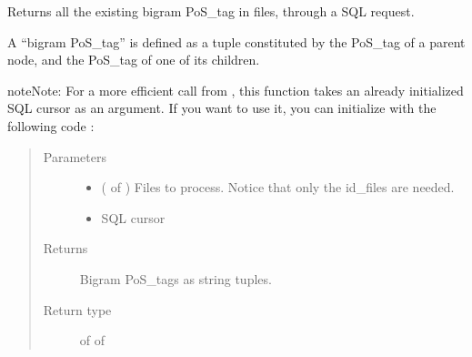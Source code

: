 \documentclass[letterpaper,10pt,english]{sphinxmanual}
\begin{document}

\begin{fulllineitems}
\label{\detokenize{analysis:loacore.analysis.frequencies.get_bigram_pos_tag_set}}
Returns all the existing bigram PoS\_tag in files, through a SQL request.

A “bigram PoS\_tag” is defined as a tuple constituted by the PoS\_tag of a parent node, and the PoS\_tag of one of its
children.

\begin{sphinxadmonition}{note}{Note:}
For a more efficient call from {\hyperref[\detokenize{analysis:loacore.analysis.frequencies.bigram_pos_tag_frequencies}]{}}, this function takes an already initialized SQL
cursor as an argument.
If you want to use it, you can initialize  with the following code :

%
\begin{sphinxVerbatim}[commandchars=\\\{\}]
   
   
  
  
\end{sphinxVerbatim}
\end{sphinxadmonition}
\begin{quote}\begin{description}
\item[{Parameters}] \leavevmode\begin{itemize}
\item {} 
 ( of {\hyperref[\detokenize{classes:loacore.classes.classes.File}]{}}) \textendash{} Files to process. Notice that only the id\_files are needed.

\item {} 
 \textendash{} SQL cursor

\end{itemize}

\item[{Returns}] \leavevmode
Bigram PoS\_tags as string tuples.

\item[{Return type}] \leavevmode
{} of  of 

\end{description}\end{quote}

\end{fulllineitems}
\end{document}
